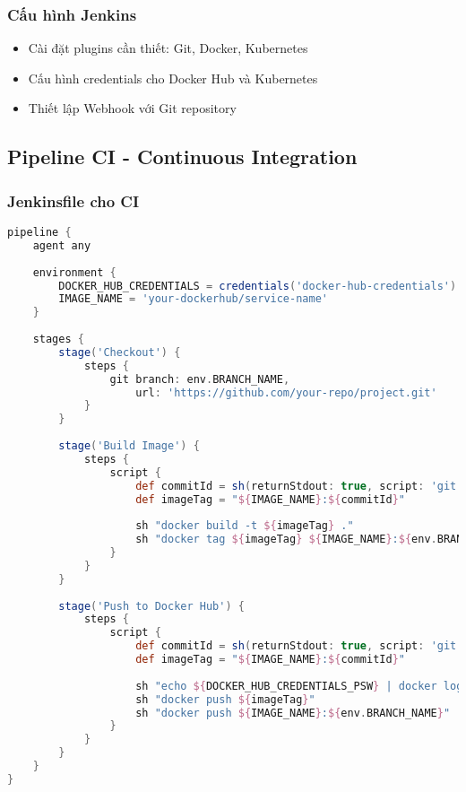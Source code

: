 \documentclass[12pt,a4paper]{article}
\begin{document}
\subsubsection{Cấu hình Jenkins}
\begin{itemize}
    \item Cài đặt plugins cần thiết: Git, Docker, Kubernetes
    \item Cấu hình credentials cho Docker Hub và Kubernetes
    \item Thiết lập Webhook với Git repository
\end{itemize}

\subsection{Pipeline CI - Continuous Integration}

\subsubsection{Jenkinsfile cho CI}
\begin{lstlisting}[language=groovy, caption=Pipeline CI tự động build image]
pipeline {
    agent any
    
    environment {
        DOCKER_HUB_CREDENTIALS = credentials('docker-hub-credentials')
        IMAGE_NAME = 'your-dockerhub/service-name'
    }
    
    stages {
        stage('Checkout') {
            steps {
                git branch: env.BRANCH_NAME, 
                    url: 'https://github.com/your-repo/project.git'
            }
        }
        
        stage('Build Image') {
            steps {
                script {
                    def commitId = sh(returnStdout: true, script: 'git rev-parse HEAD').trim()
                    def imageTag = "${IMAGE_NAME}:${commitId}"
                    
                    sh "docker build -t ${imageTag} ."
                    sh "docker tag ${imageTag} ${IMAGE_NAME}:${env.BRANCH_NAME}"
                }
            }
        }
        
        stage('Push to Docker Hub') {
            steps {
                script {
                    def commitId = sh(returnStdout: true, script: 'git rev-parse HEAD').trim()
                    def imageTag = "${IMAGE_NAME}:${commitId}"
                    
                    sh "echo ${DOCKER_HUB_CREDENTIALS_PSW} | docker login -u ${DOCKER_HUB_CREDENTIALS_USR} --password-stdin"
                    sh "docker push ${imageTag}"
                    sh "docker push ${IMAGE_NAME}:${env.BRANCH_NAME}"
                }
            }
        }
    }
}
\end{lstlisting}
\end{document}
